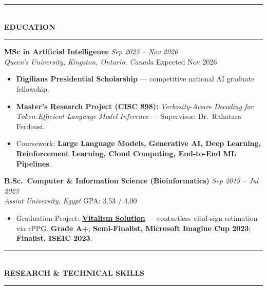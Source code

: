 \documentclass[10pt, a4paper]{article}
\newcommand{\cvsection}[1]{%
  \vspace{3pt}%
  {\color{navy}\rule{\linewidth}{1.1pt}}\\[0.5pt]%
  {\color{navy}\bfseries\fontsize{9.5}{11}\selectfont\uppercase{#1}}\\[-4pt]%
  {\color{teal}\rule{\linewidth}{0.6pt}}%
  \vspace{2pt}%
}
\newcommand{\cventry}[4]{%
  \vspace{2.5pt}%
  \textbf{\color{darkgray}#1} \hfill {\color{midgray}\textit{#3}}\\[-1.5pt]%
  {\color{teal}\textit{#2}} \hfill {\color{midgray}#4}%
}
\newenvironment{cvitems}{%
  \begin{itemize}[leftmargin=11pt, itemsep=0.5pt, parsep=0pt, topsep=1pt,
                  label={\textcolor{teal}{$\bullet$}}]
}{%
  \end{itemize}%
}
\begin{document}
\cvsection{Education}

\cventry{MSc in Artificial Intelligence}{Queen's University, Kingston, Ontario, Canada}
        {Sep 2025 -- Nov 2026}{Expected Nov 2026}
\begin{cvitems}
  \item \textbf{Digilians Presidential Scholarship} --- competitive national AI graduate fellowship.
  \item \textbf{Master's Research Project (CISC 898):} \textit{Verbosity-Aware Decoding for Token-Efficient Language Model Inference} --- Supervisor: Dr.\ Rahatara Ferdousi.
  \item Coursework: \textbf{Large Language Models, Generative AI, Deep Learning, Reinforcement Learning, Cloud Computing, End-to-End ML Pipelines}.
\end{cvitems}

\cventry{B.Sc.\ Computer \& Information Science (Bioinformatics)}{Assiut University, Egypt}
        {Sep 2019 -- Jul 2023}{GPA: 3.53 / 4.00}
\begin{cvitems}
  \item Graduation Project: \href{https://vitalismsolution.github.io/}{\textbf{Vitalism Solution}} --- contactless vital-sign estimation via rPPG. \textbf{Grade A+}; \textbf{Semi-Finalist, Microsoft Imagine Cup 2023}; \textbf{Finalist, ISEIC 2023}.
\end{cvitems}

\cvsection{Research \& Technical Skills}
\end{document}
